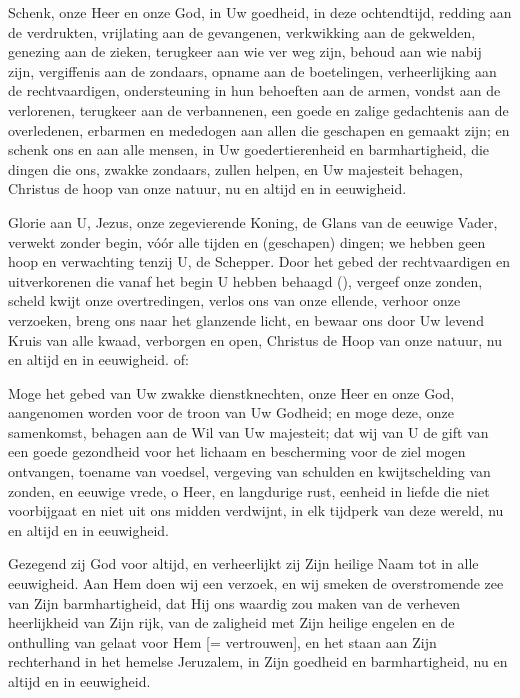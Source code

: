 \documentclass[12pt,twoside,a5paper]{article}
\begin{document}
\begin{halfparskip}
  Schenk, onze Heer en onze God, in Uw goedheid, in deze ochtendtijd, redding aan de verdrukten, vrijlating aan de gevangenen, verkwikking aan de gekwelden, genezing aan de zieken, terugkeer aan wie ver weg zijn, behoud aan wie nabij zijn, vergiffenis aan de zondaars, opname aan de boetelingen, verheerlijking aan de rechtvaardigen, ondersteuning in hun behoeften aan de armen, vondst aan de verlorenen, terugkeer aan de verbannenen, een goede en zalige gedachtenis aan de overledenen, erbarmen en mededogen aan allen die geschapen en gemaakt zijn; en schenk ons en aan alle mensen, in Uw goedertierenheid en barmhartigheid, die dingen die ons, zwakke zondaars, zullen helpen, en Uw majesteit behagen, Christus de hoop van onze natuur, nu en altijd en in eeuwigheid. 

   Glorie aan U, Jezus, onze zegevierende Koning, de Glans van de eeuwige Vader, verwekt zonder begin, vóór alle tijden en (geschapen) dingen; we hebben geen hoop en verwachting tenzij U, de Schepper. Door het gebed der rechtvaardigen en uitverkorenen die vanaf het begin U hebben behaagd (), vergeef onze zonden, scheld kwijt onze overtredingen, verlos ons van onze ellende, verhoor onze verzoeken, breng ons naar het glanzende licht, en bewaar ons door Uw levend Kruis van alle kwaad, verborgen en open, Christus de Hoop van onze natuur, nu en altijd en in eeuwigheid. of:

   Moge het gebed van Uw zwakke dienstknechten, onze Heer en onze God, aangenomen worden voor de troon van Uw Godheid; en moge deze, onze samenkomst, behagen aan de Wil van Uw majesteit; dat wij van U de gift van een goede gezondheid voor het lichaam en bescherming voor de ziel mogen ontvangen, toename van voedsel, vergeving van schulden en kwijtschelding van zonden, en eeuwige vrede, o Heer, en langdurige rust, eenheid in liefde die niet voorbijgaat en niet uit ons midden verdwijnt, in elk tijdperk van deze wereld, nu en altijd en in eeuwigheid.

   Gezegend zij God voor altijd, en verheerlijkt zij Zijn heilige Naam tot in alle eeuwigheid. Aan Hem doen wij een verzoek, en wij smeken de overstromende zee van Zijn barmhartigheid, dat Hij ons waardig zou maken van de verheven heerlijkheid van Zijn rijk, van de zaligheid met Zijn heilige engelen en de onthulling van gelaat voor Hem [= vertrouwen], en het staan aan Zijn rechterhand in het hemelse Jeruzalem, in Zijn goedheid en barmhartigheid, nu en altijd en in eeuwigheid.


\end{halfparskip}
\end{document}
